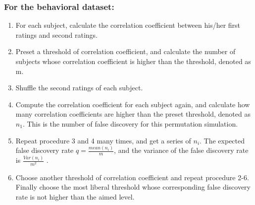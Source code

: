 \documentclass[11pt,notitlepage]{article}
\begin{document}
\subsubsection*{For the behavioral dataset:}

\begin{enumerate}
	\item For each subject, calculate the correlation coefficient between his/her first ratings and second ratings.
	\item Preset a threshold of correlation coefficient, and calculate the number of subjects whose correlation coefficient is higher than the threshold, denoted as m.
	\item Shuffle the second ratings of each subject.
	
	\item Compute the correlation coefficient for each subject again, and calculate how many correlation coefficients are higher than the preset threshold, denoted as $ n_1 $. This is the number of false discovery for this permutation simulation.
	
	\item Repeat procedure 3 and 4 many times, and get a series of $ n_i $. The expected false discovery rate $ q=\frac{mean(n_i)}{m} $, and the variance of the false discovery rate is $\frac{Var(n_i)}{m^2} $ .
	\item Choose another threshold of correlation coefficient and repeat procedure 2-6. Finally choose the most liberal threshold whose corresponding false discovery rate is not higher than the aimed level.
	
\end{enumerate}







\end{document}
